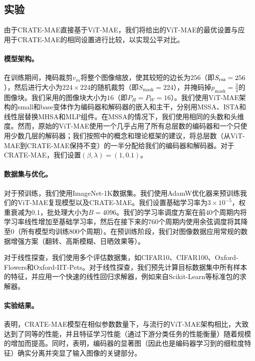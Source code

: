\documentclass[../../book-main.tex]{subfiles}
\begin{document}
\subsection{实验}\label{sub:image_completion_experiments}

由于CRATE-MAE直接基于ViT-MAE，我们将\citep{he2022masked}给出的ViT-MAE的最优设置与应用于CRATE-MAE的相同设置进行比较，以实现公平对比。

\paragraph{模型架构。} 在训练期间，掩码裁剪\(v_{m}\)将整个图像缩放，使其较短的边长为\(256\)（即\(S_{\mathrm{rsz}} = 256\)），然后进行大小为\(224 \times 224\)的随机裁剪（即\(S_{\mathrm{mask}} = 224\)），并掩码掉\(p_{\mathrm{mask}} = \frac{3}{4}\)的图像块。我们采用的图像块大小为\(16\)（即\(P_{H} = P_{W} = 16\)）。我们使用ViT-MAE架构的small和base变体作为编码器和解码器的嵌入和主干，分别用MSSA、ISTA和线性层替换MHSA和MLP组件。在MSSA的情况下，我们使用相同的头数和头维度。然而，原始的ViT-MAE使用一个几乎占用了所有总层数的编码器和一个只使用少数几层的解码器；我们按照中的概念和理论框架的建议，将总层数（从ViT-MAE到CRATE-MAE保持不变）的一半分配给我们的编码器和解码器。对于CRATE-MAE，我们设置\((\beta, \lambda) = (1, 0.1)\)。

\paragraph{数据集与优化。} 对于预训练，我们使用ImageNet-1K数据集。我们使用AdamW优化器来预训练我们的ViT-MAE复现模型以及CRATE-MAE。我们设置基础学习率为\(3 \times 10^{-5}\)，权重衰减为\(0.1\)，批处理大小为\(B = 4096\)。我们的学习率调度方案在前\(40\)个周期内将学习率线性增加至基础学习率，然后在接下来的\(760\)个周期内使用余弦调度将其降至\(0\)（所有模型均训练\(800\)个周期）。在预训练阶段，我们对图像数据应用常规的数据增强方案（翻转、高斯模糊、日晒效果等）。

对于线性探查，我们使用多个评估数据集，如CIFAR10、CIFAR100、Oxford-Flowers和Oxford-IIT-Pets。对于线性探查，我们预先计算目标数据集中所有样本的特征，并应用一个快速的线性回归求解器，例如来自Scikit-Learn等标准包的求解器。

\paragraph{实验结果。} 表明，CRATE-MAE模型在相似参数数量下，与流行的ViT-MAE架构相比，大致达到了同等的性能，并且特征学习性能（通过下游分类任务的性能衡量）随着规模的增加而提高。同时，表明，编码器的显著图（因此也是编码器学习到的细粒度特征）确实分离并突显了输入图像的关键部分。
\end{document}
